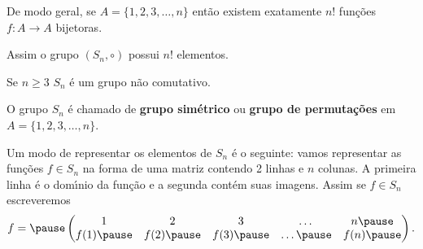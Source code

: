 \documentclass{beamer}
\begin{document}
    \begin{frame}
        De modo geral, \pause se $A = \{1, 2, 3, \dots, n\}$ \pause ent\~ao existem exatamente $n!$ \pause fun\c{c}\~oes $f : A \to A$ bijetoras. \pause

        \vspace{.3cm}

        Assim o grupo $(S_n, \circ)$ \pause possui $n!$ elementos.\pause

        \vspace{.3cm}

        Se $n \geqslant 3$ \pause $S_n$ \'e um grupo n\~ao comutativo.\pause

        \begin{definicao}
            O grupo $S_n$ \'e chamado de \pause \textbf{grupo sim\'etrico} \pause ou \textbf{grupo de permuta\c{c}\~oes} \pause em $A = \{1, 2, 3, \dots, n\}$.
        \end{definicao}
    \end{frame}

    \begin{frame}
        Um modo de representar os elementos de $S_n$ \'e o seguinte: \pause vamos representar as fun\c{c}\~oes $f \in S_n$ \pause na forma de uma matriz contendo 2 linhas \pause e $n$ colunas. \pause A primeira linha \'e o dom{\'\i}nio da fun\c{c}\~ao \pause e a segunda cont\'em suas imagens. \pause Assim se $f \in S_n$ escreveremos\pause
        \[
            f = \pause \begin{pmatrix}
                1 & 2 & 3 & \dots & n\pause \\
                f(1) \pause & f(2) \pause & f(3) \pause & \dots \pause & f(n)\pause
            \end{pmatrix}.
        \]
    \end{frame}
\end{document}
